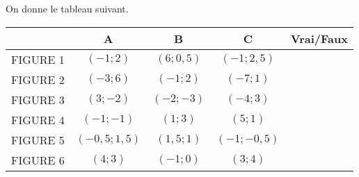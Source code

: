 

On donne le tableau suivant.

\begin{tabular}{|c|c|c|c|c|}
\hline 
 & A & B & C & Vrai/Faux \\ 
\hline 
FIGURE 1 & $(-1;2)$ & $(6;0,5)$ & $(-1;2,5)$ &  \\ 
\hline 
FIGURE 2 & $(-3;6)$ & $(-1;2)$ & $(-7;1)$ &  \\ 
\hline 
FIGURE 3 & $(3;-2)$ & $(-2;-3)$ & $(-4;3)$ &  \\ 
\hline 
FIGURE 4 & $(-1;-1)$ & $(1;3)$ & $(5;1)$ & \\ 
\hline 
FIGURE 5 & $(-0,5;1,5)$ & $(1,5;1)$ & $(-1;-0,5)$ &  \\ 
\hline 
FIGURE 6 & $(4;3)$ & $(-1;0)$ & $(3;4)$ &  \\ 
\hline 
\end{tabular} 

\vspace{1cm}
 
